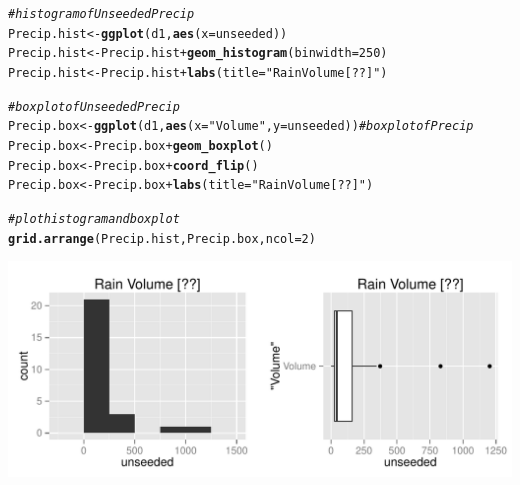 \documentclass{article}\usepackage[]{graphicx}\usepackage[]{color}
\makeatletter
\def\maxwidth{ %
  \ifdim\Gin@nat@width>\linewidth
    \linewidth
  \else
    \Gin@nat@width
  \fi
}
\newcommand{\hlnum}[1]{\textcolor[rgb]{0.686,0.059,0.569}{#1}}%
\newcommand{\hlstr}[1]{\textcolor[rgb]{0.192,0.494,0.8}{#1}}%
\newcommand{\hlcom}[1]{\textcolor[rgb]{0.678,0.584,0.686}{\textit{#1}}}%
\newcommand{\hlopt}[1]{\textcolor[rgb]{0,0,0}{#1}}%
\newcommand{\hlstd}[1]{\textcolor[rgb]{0.345,0.345,0.345}{#1}}%
\newcommand{\hlkwb}[1]{\textcolor[rgb]{0.69,0.353,0.396}{#1}}%
\newcommand{\hlkwc}[1]{\textcolor[rgb]{0.333,0.667,0.333}{#1}}%
\newcommand{\hlkwd}[1]{\textcolor[rgb]{0.737,0.353,0.396}{\textbf{#1}}}%
\newenvironment{kframe}{%
 \def\at@end@of@kframe{}%
 \ifinner\ifhmode%
  \def\at@end@of@kframe{\end{minipage}}%
  \begin{minipage}{\columnwidth}%
 \fi\fi%
 \def\FrameCommand##1{\hskip\@totalleftmargin \hskip-\fboxsep
 \colorbox{shadecolor}{##1}\hskip-\fboxsep
     \hskip-\linewidth \hskip-\@totalleftmargin \hskip\columnwidth}%
 \MakeFramed {\advance\hsize-\width
   \@totalleftmargin\z@ \linewidth\hsize
   \@setminipage}}%
 {\par\unskip\endMakeFramed%
 \at@end@of@kframe}
\newenvironment{knitrout}{}{} %
\makeatother
\begin{document}
\begin{knitrout}
\color{fgcolor}\begin{kframe}
\begin{alltt}
\hlcom{# histogram of Unseeded Precip}
\hlstd{Precip.hist} \hlkwb{<-} \hlkwd{ggplot}\hlstd{(d1,} \hlkwd{aes}\hlstd{(}\hlkwc{x} \hlstd{= unseeded))}
\hlstd{Precip.hist} \hlkwb{<-} \hlstd{Precip.hist} \hlopt{+} \hlkwd{geom_histogram}\hlstd{(}\hlkwc{binwidth} \hlstd{=} \hlnum{250}\hlstd{)}
\hlstd{Precip.hist} \hlkwb{<-} \hlstd{Precip.hist} \hlopt{+} \hlkwd{labs}\hlstd{(}\hlkwc{title} \hlstd{=} \hlstr{"Rain Volume [??]"}\hlstd{)}

\hlcom{# boxplot of Unseeded Precip}
\hlstd{Precip.box} \hlkwb{<-} \hlkwd{ggplot}\hlstd{(d1,} \hlkwd{aes}\hlstd{(}\hlkwc{x} \hlstd{=} \hlstr{"Volume"}\hlstd{,} \hlkwc{y} \hlstd{= unseeded))} \hlcom{# boxplot of Precip}
\hlstd{Precip.box} \hlkwb{<-} \hlstd{Precip.box} \hlopt{+} \hlkwd{geom_boxplot}\hlstd{()}
\hlstd{Precip.box} \hlkwb{<-} \hlstd{Precip.box} \hlopt{+} \hlkwd{coord_flip}\hlstd{()}
\hlstd{Precip.box} \hlkwb{<-} \hlstd{Precip.box} \hlopt{+} \hlkwd{labs}\hlstd{(}\hlkwc{title} \hlstd{=} \hlstr{"Rain Volume [??]"}\hlstd{)}

\hlcom{# plot histogram and boxplot}
\hlkwd{grid.arrange}\hlstd{(Precip.hist, Precip.box,} \hlkwc{ncol} \hlstd{=} \hlnum{2}\hlstd{)}
\end{alltt}
\end{kframe}
\includegraphics[width=\maxwidth]{figure/1a_} 

\end{knitrout}
\end{document}

